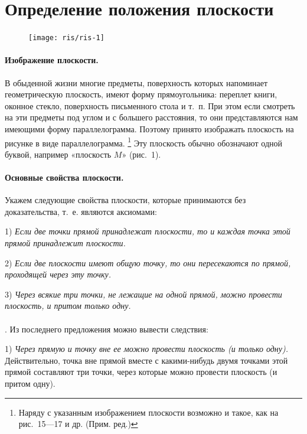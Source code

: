\documentclass[twoside]{book}
\begin{document}
\section{Определение положения плоскости}


\begin{figure}[h!]
\centering
\texttt{[image: ris/ris-1]}
\caption{}
\end{figure} 

\paragraph{Изображение плоскости.}\label{1938/s2}
В обыденной жизни многие предметы, поверхность которых напоминает геометрическую плоскость, имеют форму прямоугольника: переплет книги, оконное стекло, поверхность письменного стола и т.~п.
При этом если смотреть на эти предметы под углом и с большего расстояния, то они представляются нам имеющими форму параллелограмма.
Поэтому принято изображать плоскость на рисунке в виде параллелограмма.%
\footnote{Наряду с указанным изображением плоскости возможно и такое, как на рис.~15---17 и др. (Прим. ред.)%
}
Эту плоскость обычно обозначают одной буквой, например «плоскость $M$» (рис.~1).

\paragraph{Основные свойства плоскости.}\label{1938/s3}
Укажем следующие свойства плоскости, которые принимаются без доказательства, т.~е. являются аксиомами:

1) \emph{Если две точки прямой принадлежат плоскости, то и каждая точка этой прямой принадлежит плоскости.}

2) \emph{Если две плоскости имеют общую точку, то они пересекаются по прямой, проходящей через эту точку.}

3) \emph{Через всякие три точки, не лежащие на одной прямой, можно провести плоскость, и притом только одну.}


\paragraph{} \label{1938/s4}
. Из последнего предложения можно вывести следствия:

1) \emph{Через прямую и точку вне ее можно провести плоскость (и только одну).} Действительно, точка вне прямой вместе с какими-нибудь двумя точками этой прямой составляют три точки, через которые можно провести плоскость (и притом одну). %
\end{document}

